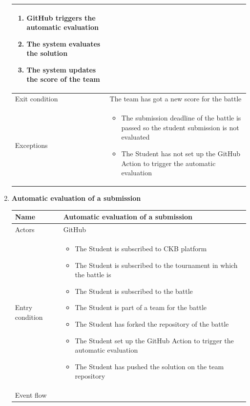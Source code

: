 \begin{enumerate}[label=UC\arabic*:]
\begin{tabular}{|p{3cm}|p{8cm}|}
\begin{enumerate}[label=\arabic*.]
            \item GitHub triggers the automatic evaluation
            \item The system evaluates the solution
            \item The system updates the score of the team
        \end{enumerate} \\
        \hline
        Exit condition & The team has got a new score for the battle \\
        \hline
        Exceptions &
        \begin{itemize}
            \item The submission deadline of the battle is passed so the student submission is not evaluated
            \item The Student has not set up the GitHub Action to trigger the automatic evaluation
        \end{itemize} \\
        \hline
    \end{tabular}
    \item \textbf{Automatic evaluation of a submission} \\
    \begin{tabular}{|p{3cm}|p{8cm}|}
        \hline
        Name & Automatic evaluation of a submission \\
        \hline
        Actors & GitHub \\
        \hline
        Entry condition &
        \begin{itemize}
            \item The Student is subscribed to CKB platform
            \item The Student is subscribed to the tournament in which the battle is
            \item The Student is subscribed to the battle
            \item The Student is part of a team for the battle
            \item The Student has forked the repository of the battle
            \item The Student set up the GitHub Action to trigger the automatic evaluation
            \item The Student has pushed the solution on the team repository
        \end{itemize} \\
        \hline
        Event flow &
        \begin{enumerate}[label=\arabic*.]

\end{enumerate}
\end{tabular}
\end{enumerate}
